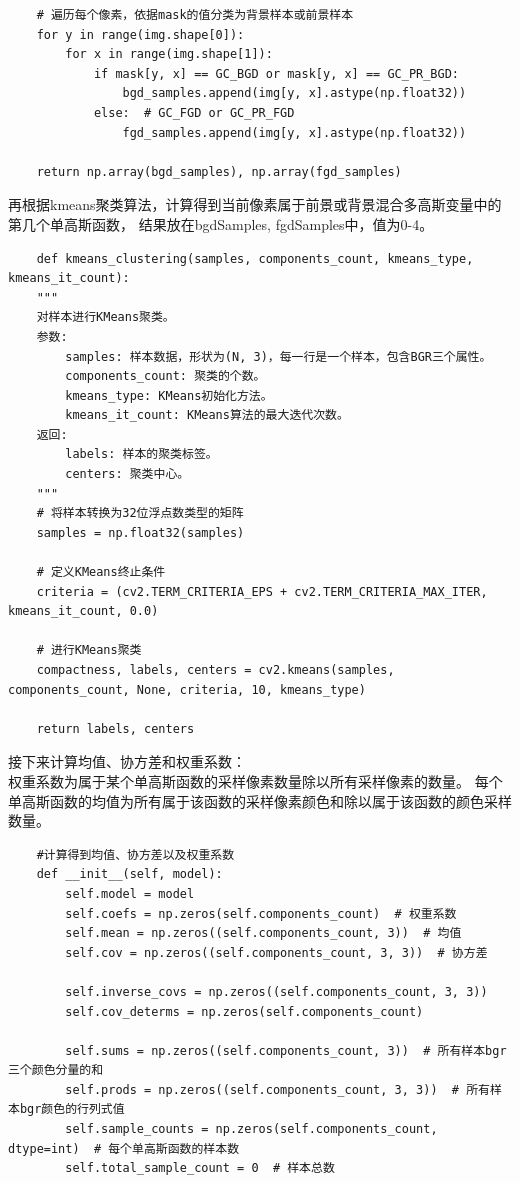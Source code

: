 \documentclass[12pt,a4paper]{article}
\begin{document}
\begin{CJK}{UTF8}{gbsn}
\begin{sloppypar}
\begin{lstlisting}
    # 遍历每个像素，依据mask的值分类为背景样本或前景样本
    for y in range(img.shape[0]):
        for x in range(img.shape[1]):
            if mask[y, x] == GC_BGD or mask[y, x] == GC_PR_BGD:
                bgd_samples.append(img[y, x].astype(np.float32))
            else:  # GC_FGD or GC_PR_FGD
                fgd_samples.append(img[y, x].astype(np.float32))

    return np.array(bgd_samples), np.array(fgd_samples)
\end{lstlisting}
再根据kmeans聚类算法，计算得到当前像素属于前景或背景混合多高斯变量中的第几个单高斯函数，
结果放在bgdSamples, fgdSamples中，值为0-4。
\begin{lstlisting}
    def kmeans_clustering(samples, components_count, kmeans_type, kmeans_it_count):
    """
    对样本进行KMeans聚类。
    参数:
        samples: 样本数据，形状为(N, 3)，每一行是一个样本，包含BGR三个属性。
        components_count: 聚类的个数。
        kmeans_type: KMeans初始化方法。
        kmeans_it_count: KMeans算法的最大迭代次数。
    返回:
        labels: 样本的聚类标签。
        centers: 聚类中心。
    """
    # 将样本转换为32位浮点数类型的矩阵
    samples = np.float32(samples)
    
    # 定义KMeans终止条件
    criteria = (cv2.TERM_CRITERIA_EPS + cv2.TERM_CRITERIA_MAX_ITER, kmeans_it_count, 0.0)
    
    # 进行KMeans聚类
    compactness, labels, centers = cv2.kmeans(samples, components_count, None, criteria, 10, kmeans_type)
    
    return labels, centers
\end{lstlisting}
接下来计算均值、协方差和权重系数：\\
权重系数为属于某个单高斯函数的采样像素数量除以所有采样像素的数量。
每个单高斯函数的均值为所有属于该函数的采样像素颜色和除以属于该函数的颜色采样数量。
\begin{lstlisting}
    #计算得到均值、协方差以及权重系数
    def __init__(self, model):
        self.model = model
        self.coefs = np.zeros(self.components_count)  # 权重系数
        self.mean = np.zeros((self.components_count, 3))  # 均值
        self.cov = np.zeros((self.components_count, 3, 3))  # 协方差

        self.inverse_covs = np.zeros((self.components_count, 3, 3))
        self.cov_determs = np.zeros(self.components_count)

        self.sums = np.zeros((self.components_count, 3))  # 所有样本bgr三个颜色分量的和
        self.prods = np.zeros((self.components_count, 3, 3))  # 所有样本bgr颜色的行列式值
        self.sample_counts = np.zeros(self.components_count, dtype=int)  # 每个单高斯函数的样本数
        self.total_sample_count = 0  # 样本总数


\end{lstlisting}
\end{sloppypar}
\end{CJK}
\end{document}
